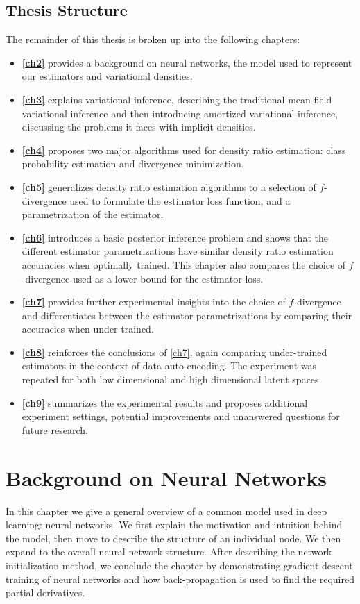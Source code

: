 \documentclass[honours,12pt, twoside]{unswthesis}
\numberwithin{equation}{section}
\theoremstyle{definition}
\begin{document}
\section{Thesis Structure}
The remainder of this thesis is broken up into the following chapters:
\begin{itemize}
\item \textbf{\autoref{ch2}} provides a background on neural networks, the model used to represent our estimators and variational densities.
\item \textbf{\autoref{ch3}} explains variational inference, describing the traditional mean-field variational inference and then introducing amortized variational inference, discussing the problems it faces with implicit densities.
\item \textbf{\autoref{ch4}} proposes two major algorithms used for density ratio estimation: class probability estimation and divergence minimization.
\item \textbf{\autoref{ch5}} generalizes density ratio estimation algorithms to a selection of $f$-divergence used to formulate the estimator loss function, and a parametrization of the estimator.
\item \textbf{\autoref{ch6}} introduces a basic posterior inference problem and shows that the different estimator parametrizations have similar density ratio estimation accuracies when optimally trained. This chapter also compares the choice of $f$-divergence used as a lower bound for the estimator loss.
\item \textbf{\autoref{ch7}} provides further experimental insights into the choice of $f$-divergence and differentiates between the estimator parametrizations by comparing their accuracies when under-trained.
\item \textbf{\autoref{ch8}} reinforces the conclusions of \autoref{ch7}, again comparing under-trained estimators in the context of data auto-encoding. The experiment was repeated for both low dimensional and high dimensional latent spaces.
\item \textbf{\autoref{ch9}} summarizes the experimental results and proposes additional experiment settings, potential improvements and unanswered questions for future research.
\end{itemize}



\chapter{Background on Neural Networks}\label{ch2}
In this chapter we give a general overview of a common model used in deep learning: neural networks. We first explain the motivation and intuition behind the model, then move to describe the structure of an individual node. We then expand to the overall neural network structure. After describing the network initialization method, we conclude the chapter by demonstrating gradient descent training of neural networks and how back-propagation is used to find the required partial derivatives.
\end{document}
